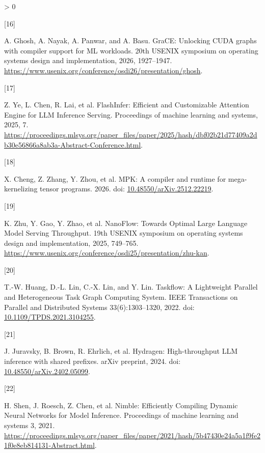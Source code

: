 \documentclass[
  11pt,
  UTF8]{ctexart}
\newlength{\cslhangindent}
\newlength{\csllabelwidth}
\newenvironment{CSLReferences}[2] %
 {%
  \setlength{\parindent}{0pt}
  \ifodd #1 \everypar{\setlength{\hangindent}{\cslhangindent}}\ignorespaces\fi
  \ifnum #2 > 0
  \setlength{\parskip}{#2\baselineskip}
  \fi
 }%
 {}
\newcommand{\CSLLeftMargin}[1]{\parbox[t]{\csllabelwidth}{#1}}
\newcommand{\CSLRightInline}[1]{\parbox[t]{\linewidth - \csllabelwidth}{#1}\break}
\begin{document}
\begin{CSLReferences}{0}{0}
\leavevmode{}%
\CSLLeftMargin{{[}16{]} }
\CSLRightInline{A. Ghosh, A. Nayak, A. Panwar, and A. Basu. {GraCE}:
Unlocking {CUDA} graphs with compiler support for {ML} workloads. 20th
USENIX symposium on operating systems design and implementation, 2026,
1927--1947.
\url{https://www.usenix.org/conference/osdi26/presentation/ghosh}.}

\leavevmode{}%
\CSLLeftMargin{{[}17{]} }
\CSLRightInline{Z. Ye, L. Chen, R. Lai, et al. {FlashInfer: Efficient
and Customizable Attention Engine for LLM Inference Serving}.
Proceedings of machine learning and systems, 2025, 7.
\url{https://proceedings.mlsys.org/paper_files/paper/2025/hash/dbf02b21d77409a2db30e56866a8ab3a-Abstract-Conference.html}.}

\leavevmode{}%
\CSLLeftMargin{{[}18{]} }
\CSLRightInline{X. Cheng, Z. Zhang, Y. Zhou, et al. MPK: A compiler and
runtime for mega-kernelizing tensor programs. 2026. doi:
\href{https://doi.org/10.48550/arXiv.2512.22219}{10.48550/arXiv.2512.22219}.}

\leavevmode{}%
\CSLLeftMargin{{[}19{]} }
\CSLRightInline{K. Zhu, Y. Gao, Y. Zhao, et al. {NanoFlow: Towards
Optimal Large Language Model Serving Throughput}. 19th USENIX symposium
on operating systems design and implementation, 2025, 749--765.
\url{https://www.usenix.org/conference/osdi25/presentation/zhu-kan}.}

\leavevmode{}%
\CSLLeftMargin{{[}20{]} }
\CSLRightInline{T.-W. Huang, D.-L. Lin, C.-X. Lin, and Y. Lin.
{Taskflow: A Lightweight Parallel and Heterogeneous Task Graph Computing
System}. IEEE Transactions on Parallel and Distributed Systems
33(6):1303--1320, 2022. doi:
\href{https://doi.org/10.1109/TPDS.2021.3104255}{10.1109/TPDS.2021.3104255}.}

\leavevmode{}%
\CSLLeftMargin{{[}21{]} }
\CSLRightInline{J. Juravsky, B. Brown, R. Ehrlich, et al. Hydragen:
High-throughput LLM inference with shared prefixes. arXiv preprint,
2024. doi:
\href{https://doi.org/10.48550/arXiv.2402.05099}{10.48550/arXiv.2402.05099}.}

\leavevmode{}%
\CSLLeftMargin{{[}22{]} }
\CSLRightInline{H. Shen, J. Roesch, Z. Chen, et al. {Nimble: Efficiently
Compiling Dynamic Neural Networks for Model Inference}. Proceedings of
machine learning and systems 3, 2021.
\url{https://proceedings.mlsys.org/paper_files/paper/2021/hash/5b47430e24a5a1f9fe21f0e8eb814131-Abstract.html}.}


\end{CSLReferences}
\end{document}

